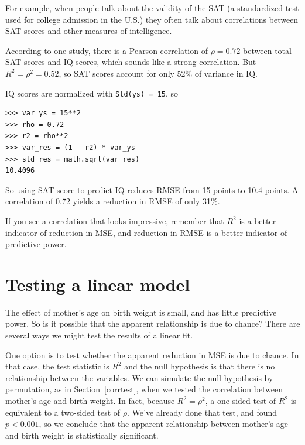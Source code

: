 \documentclass[12pt]{book}
\theoremstyle{exercise}
\begin{document}
For example, when people talk about the validity of the SAT
(a standardized test used for college admission in the U.S.) they
often talk about correlations between SAT scores and other measures of
intelligence.%
%

According to one study, there is a Pearson correlation of
$\rho=0.72$ between total SAT scores and IQ scores, which sounds like
a strong correlation.  But $R^2 = \rho^2 = 0.52$, so SAT scores
account for only 52\% of variance in IQ.

IQ scores are normalized with {\tt Std(ys) = 15}, so

\begin{verbatim}
>>> var_ys = 15**2
>>> rho = 0.72
>>> r2 = rho**2
>>> var_res = (1 - r2) * var_ys
>>> std_res = math.sqrt(var_res)
10.4096
\end{verbatim}

So using SAT score to predict IQ reduces RMSE from 15 points to 10.4
points.  A correlation of 0.72 yields a reduction in RMSE of only
31\%.

If you see a correlation that looks impressive, remember that $R^2$ is
a better indicator of reduction in MSE, and reduction in RMSE is a
better indicator of predictive power.%
%
%


\section{Testing a linear model}

The effect of mother's age on birth weight is small, and has little
predictive power.  So is it possible that the apparent relationship
is due to chance?  There are several ways we might test the
results of a linear fit.%
%
%
%

One option is to test whether the apparent reduction in MSE is due to
chance.  In that case, the test statistic is $R^2$ and the null
hypothesis is that there is no relationship between the variables.  We
can simulate the null hypothesis by permutation, as in
Section~\ref{corrtest}, when we tested the correlation between
mother's age and birth weight.  In fact, because $R^2 = \rho^2$, a
one-sided test of $R^2$ is equivalent to a two-sided test of $\rho$.
We've already done that test, and found $p < 0.001$, so we conclude
that the apparent relationship between mother's age and birth weight
is statistically significant.%
%
%
%
%
%
\end{document}
